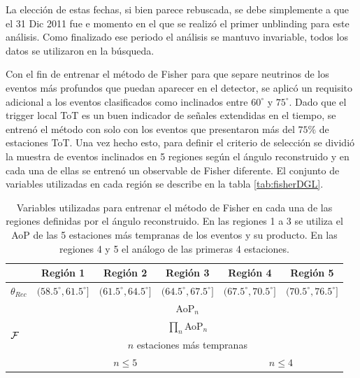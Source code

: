 	La elección de estas fechas, si bien parece rebuscada, se debe simplemente a que el 31 Dic 2011 fue e momento en el que se realizó el primer unblinding para este análisis.
	Como finalizado ese periodo el análisis se mantuvo invariable, todos los datos se utilizaron en la búsqueda.
	
	Con el fin de entrenar el método de Fisher para que separe neutrinos de los eventos más profundos que puedan aparecer en el detector, se aplicó un requisito adicional a los eventos clasificados como inclinados entre $60^\circ$ y $75^\circ$.
	Dado que el trigger local ToT es un buen indicador de señales extendidas en el tiempo, se entrenó el método con solo con los eventos que presentaron más del $75\%$ de estaciones ToT.
	Una vez hecho esto, para definir el criterio de selección se dividió la muestra de eventos inclinados en 5 regiones según el ángulo reconstruido y en cada una de ellas se entrenó un observable de Fisher diferente.
	El conjunto de variables utilizadas en cada región se describe en la tabla \ref{tab:fisherDGL}. 
	\begin{table}[h!]
		\begin{center}
		\renewcommand{\arraystretch}{1.4}
		\footnotesize
			\begin{tabular}{|l|c|c|c|c|c|}
			\hline
			& Región 1 & Región 2 & Región 3 & Región 4 & Región 5 \\
			\hline
			$\theta_{Rec}$ & $(58.5^\circ,61.5^\circ]$ & $(61.5^\circ,64.5^\circ]$ &$(64.5^\circ,67.5^\circ]$ &$(67.5^\circ,70.5^\circ]$ & $(70.5^\circ,76.5^\circ]$ \\
			\hline
			\multirow{4}{*}{$\cal{F}$}  & \multicolumn{5}{c|}{AoP$_n$} \\
			                 & \multicolumn{5}{c|}{$\prod_n$AoP$_n$} \\
			                 & \multicolumn{5}{c|}{$n$ estaciones más tempranas} \\
			                 & \multicolumn{3}{c|}{$n\leq5$} & \multicolumn{2}{c|}{$n\leq4$} \\
			\hline
			\end{tabular}
			\caption{Variables utilizadas para entrenar el método de Fisher en cada una de las regiones definidas por el ángulo reconstruido. En las regiones 1 a 3 se utiliza el AoP de las 5 estaciones más tempranas de los eventos y su producto. En las regiones 4 y 5 el análogo de las primeras 4 estaciones.}
		\end{center}	 
	\end{table}
	
